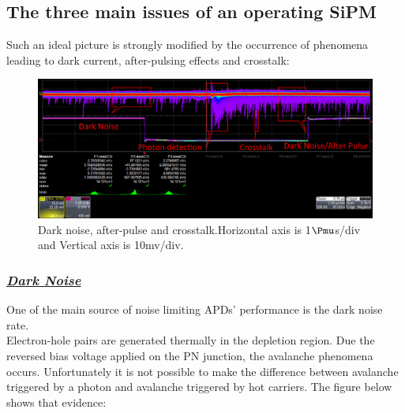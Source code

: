 \documentclass[a4paper, 11pt]{report}%
\begin{document}
  \newpage
  
  \subsection{The three main issues of an operating SiPM} 
  
  Such an ideal picture is strongly modified by the occurrence of phenomena leading to dark current, after-pulsing effects and crosstalk: 
  
  \begin{figure}[!hbtp]
  \centering
    \includegraphics[totalheight=0.2\textwidth,trim=0.3cm 6.6cm 0.1cm 0cm, clip=true]{../Pictures/Pictures_oscilloscope/DN_AP_CT_1.jpg}
    \caption{Dark noise, after-pulse and crosstalk.Horizontal axis is 1$\Pmu$s/div and Vertical axis is 10mv/div.}
    \label{fig:DN_AP_CT}
  \end{figure}
  
  \subsubsection{\textit{\underline{Dark Noise}}}\label{subsubsec:DN_photon_shape}
  
  One of the main source of noise limiting APDs' performance is the dark noise rate.\\
  Electron-hole pairs are generated thermally in the depletion region. Due the reversed bias voltage applied on the PN junction, 
  the avalanche phenomena occurs.
  Unfortunately it is not possible to make the difference between avalanche triggered by a photon and avalanche triggered by hot carriers.
  The figure below shows that evidence:
  
\end{document}
